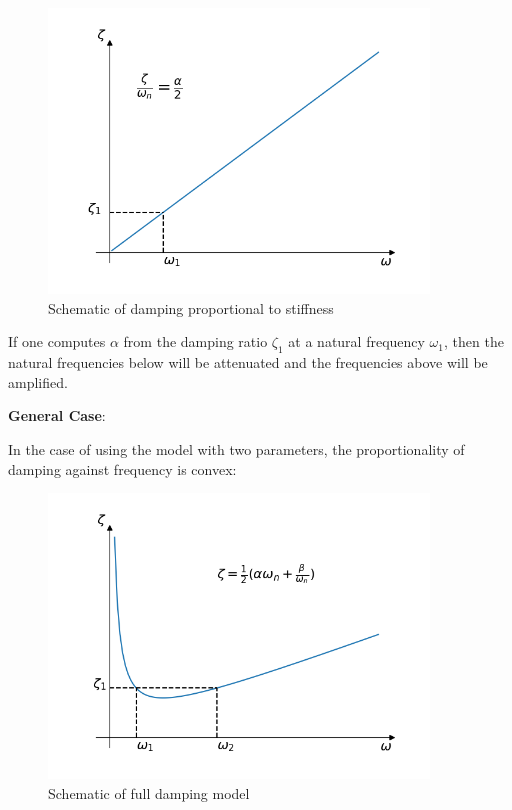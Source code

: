 \documentclass[10pt,b5paper,titlepage]{book}
\begin{document}
\begin{figure}[ht]
    \centering
    \includegraphics[width=0.90\textwidth]{img/stiffness_dependent_damping.png}
    \caption{Schematic of damping proportional to stiffness}
    \label{fig:stiffness-dependent-damping-png}
\end{figure}

If one computes $ \alpha $ from the damping ratio $ \zeta_1 $ at a natural
frequency $ \omega_1 $, then the natural frequencies below will be attenuated and
the frequencies above will be amplified.

\textbf{General Case}:

In the case of using the model with two parameters, the proportionality of damping
against frequency is convex:

\begin{figure}[ht]
    \centering
    \includegraphics[width=0.90\textwidth]{img/general_rayleigh_damping.png}
    \caption{Schematic of full damping model}
    \label{fig:general-rayleigh-damping-png}
\end{figure}
\end{document}
